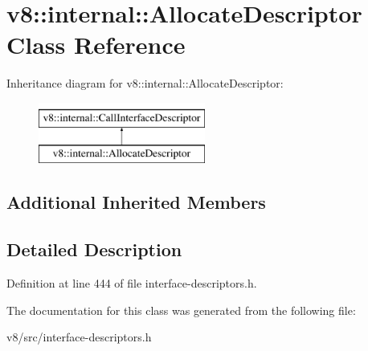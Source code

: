 \hypertarget{classv8_1_1internal_1_1AllocateDescriptor}{}\section{v8\+:\+:internal\+:\+:Allocate\+Descriptor Class Reference}
\label{classv8_1_1internal_1_1AllocateDescriptor}
Inheritance diagram for v8\+:\+:internal\+:\+:Allocate\+Descriptor\+:\begin{figure}[H]
\begin{center}
\leavevmode
\includegraphics[height=2.000000cm]{classv8_1_1internal_1_1AllocateDescriptor}
\end{center}
\end{figure}
\subsection*{Additional Inherited Members}


\subsection{Detailed Description}


Definition at line 444 of file interface-\/descriptors.\+h.



The documentation for this class was generated from the following file\+:\begin{DoxyCompactItemize}
\item 
v8/src/interface-\/descriptors.\+h\end{DoxyCompactItemize}
